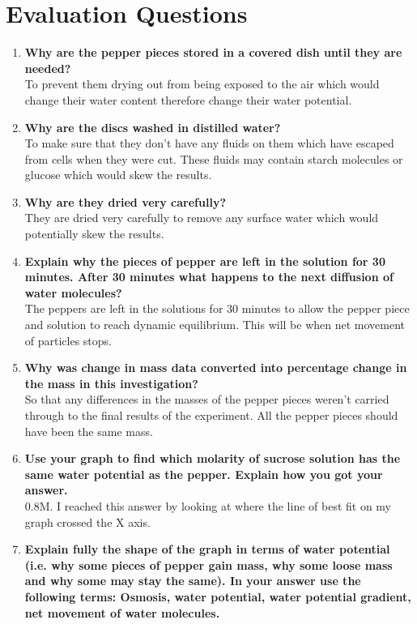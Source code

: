 \documentclass{thomasClass}
\begin{document}
\section{Evaluation Questions}
\begin{enumerate}
    \item \textbf{Why are the pepper pieces stored in a covered dish until they are needed?}\\
    To prevent them drying out from being exposed to the air which would change their water content therefore change their water potential.
    \item \textbf{Why are the discs washed in distilled water?}\\
    To make sure that they don't have any fluids on them which have escaped from cells when they were cut. These fluids may contain starch molecules or glucose which would skew the results. 
    \item \textbf{Why are they dried very carefully?}\\
    They are dried very carefully to remove any surface water which would potentially skew the results.
    \item \textbf{Explain why the pieces of pepper are left in the solution for 30 minutes. After 30 minutes what happens to the next diffusion of water molecules?}\\
    The peppers are left in the solutions for 30 minutes to allow the pepper piece and solution to reach dynamic equilibrium. This will be when net movement of particles stops. 
    \item \textbf{Why was change in mass data converted into percentage change in the mass in this investigation?}\\
    So that any differences in the masses of the pepper pieces weren't carried through to the final results of the experiment. All the pepper pieces should have been the same mass.
    \item \textbf{Use your graph to find which molarity of sucrose solution has the same water potential as the pepper. Explain how you got your answer.}\\
    0.8M. I reached this answer by looking at where the line of best fit on my graph crossed the X axis. 
    \item \textbf{Explain fully the shape of the graph in terms of water potential (i.e. why some pieces of pepper gain mass, why some loose mass and why some may stay the same). In your answer use the following terms: Osmosis, water potential, water potential gradient, net movement of water molecules.}\\

\end{enumerate}
\end{document}
